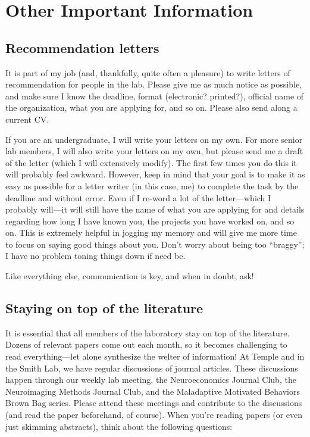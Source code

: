 \documentclass[letterpaper,12pt,oneside]{memoir}
\begin{document}
{%
\chapter{Other Important Information}
\section{Recommendation letters}
It is part of my job (and, thankfully, quite often a pleasure) to write letters of recommendation for people in the lab. Please give me as much notice as possible, and make sure I know the deadline, format (electronic? printed?), official name of the organization, what you are applying for, and so on. Please also send along a current CV.

If you are an undergraduate, I will write your letters on my own. For more senior lab members, I will also write your letters on my own, but please send me a draft of the letter (which I will extensively modify). The first few times you do this it will probably feel awkward. However, keep in mind that your goal is to make it as easy as possible for a letter writer (in this case, me) to complete the task by the deadline and without error. Even if I re-word a lot of the letter---which I probably will---it will still have the name of what you are applying for and details regarding how long I have known you, the projects you have worked on, and so on. This is extremely helpful in jogging my memory and will give me more time to focus on saying good things about you. Don't worry about being too ``braggy''; I have no problem toning things down if need be.

Like everything else, communication is key, and when in doubt, ask!

\section{Staying on top of the literature}
\label{sec:literature}

It is essential that all members of the laboratory stay on top of the literature. Dozens of relevant papers come out each month, so it becomes challenging to read everything---let alone synthesize the welter of information! At Temple and in the Smith Lab, we have regular discussions of journal articles. These discussions happen through our weekly lab meeting, the Neuroeconomics Journal Club, the Neuroimaging Methods Journal Club, and the Maladaptive Motivated Behaviors Brown Bag series. Please attend these meetings and contribute to the discussions (and read the paper beforehand, of course). When you're reading papers (or even just skimming abstracts), think about the following questions:

}
\end{document}

